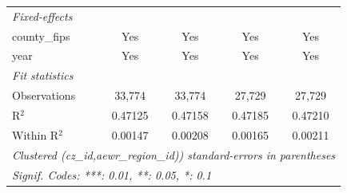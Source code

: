 \begin{tabular}{lcccc}
   \midrule
   \emph{Fixed-effects}\\
   county\_fips                                    & Yes             & Yes             & Yes                    & Yes\\  
   year                                            & Yes             & Yes             & Yes                    & Yes\\  
   \midrule
   \emph{Fit statistics}\\
   Observations                                    & 33,774          & 33,774          & 27,729                 & 27,729\\  
   R$^2$                                           & 0.47125         & 0.47158         & 0.47185                & 0.47210\\  
   Within R$^2$                                    & 0.00147         & 0.00208         & 0.00165                & 0.00211\\  
   \midrule \midrule
   \multicolumn{5}{l}{\emph{Clustered (cz\_id,aewr\_region\_id)) standard-errors in parentheses}}\\
   \multicolumn{5}{l}{\emph{Signif. Codes: ***: 0.01, **: 0.05, *: 0.1}}\\
\end{tabular}
\par\endgroup


